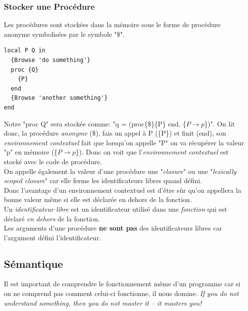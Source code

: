 \documentclass{report}
\begin{document}
\subsubsection{Stocker une Procédure}
Les procédures sont stockées dans la mémoire sous le forme de procédure anonyme symbolisées par le symbole "\$".
\begin{lstlisting}
local P Q in
  {Browse 'do something'}
  proc {Q}
    {P}
  end
  {Browse 'another something'}
end
\end{lstlisting}
Notre "proc {Q}" sera stockée comme: "q = (proc\{\$\}\{P\} end, \{$P\rightarrow p$\})". On lit donc, la procédure \textit{anonyme} (\$), fais un appel à P (\{P\}) et finit (end), son \textit{environnement contextuel} fait que lorsqu'on appelle "P" on va récupérer la valeur "p" en mémoire (\{$P\rightarrow p$\}). Donc on voit que l'\textit{environnement contextuel} est stocké avec le code de procédure.\\
On appelle également la valeur d'une procédure une "\textit{closure}" ou une "\textit{lexically scoped closure}" car elle ferme les identificateurs libres quand défini.\\
Donc l'avantage d'un environnement contextuel est d'être sûr qu'on appellera la bonne valeur même si elle est déclarée en dehors de la fonction.\\

Un \textit{identificateur libre} est un identificateur utilisé dans une \textit{fonction} qui est déclaré \textit{en dehors} de la fonction.\\
Les arguments d'une procédure \textbf{ne sont pas} des identificateurs libres car l'argument défini l'identificateur.

\subsection{Sémantique}
Il est important de comprendre le fonctionnement même d'un programme car si on ne comprend pas comment celui-ci fonctionne, il nous domine. \textit{If you do not understand something, then you do not master it – it masters you!}
\end{document}
